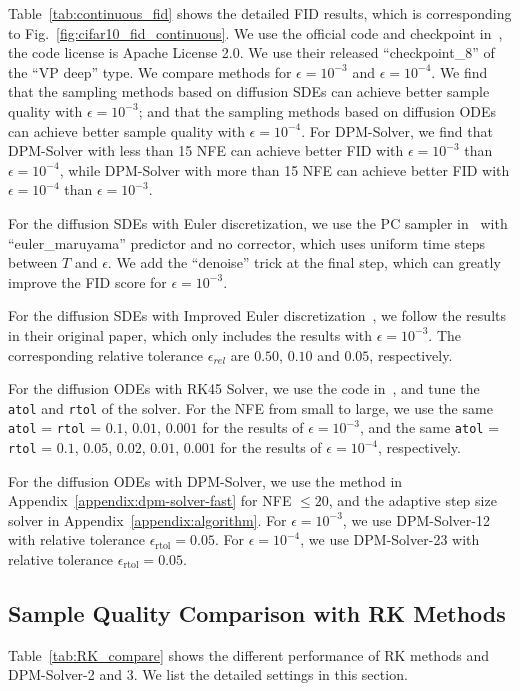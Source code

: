 Table~\ref{tab:continuous_fid} shows the detailed FID results, which is corresponding to Fig.~\ref{fig:cifar10_fid_continuous}. We use the official code and checkpoint in~\citep{song2020score}, the code license is Apache License 2.0. We use their released ``checkpoint\_8'' of the ``VP deep'' type. We compare methods for $\epsilon=10^{-3}$ and $\epsilon=10^{-4}$. We find that the sampling methods based on diffusion SDEs can achieve better sample quality with $\epsilon=10^{-3}$; and that the sampling methods based on diffusion ODEs can achieve better sample quality with $\epsilon=10^{-4}$. For DPM-Solver, we find that DPM-Solver with less than 15 NFE can achieve better FID with $\epsilon=10^{-3}$ than $\epsilon=10^{-4}$, while DPM-Solver with more than 15 NFE can achieve better FID with $\epsilon=10^{-4}$ than $\epsilon=10^{-3}$.

For the diffusion SDEs with Euler discretization, we use the PC sampler in~\citep{song2020score} with ``euler\_maruyama'' predictor and no corrector, which uses uniform time steps between $T$ and $\epsilon$. We add the ``denoise'' trick at the final step, which can greatly improve the FID score for $\epsilon=10^{-3}$.

For the diffusion SDEs with Improved Euler discretization~\citep{jolicoeur2021gotta}, we follow the results in their original paper, which only includes the results with $\epsilon=10^{-3}$. The corresponding relative tolerance $\epsilon_{rel}$ are $0.50$, $0.10$ and $0.05$, respectively.

For the diffusion ODEs with RK45 Solver, we use the code in~\citep{song2020score}, and tune the \texttt{atol} and \texttt{rtol} of the solver. For the NFE from small to large, we use the same \texttt{atol} = \texttt{rtol} = $0.1$, $0.01$, $0.001$ for the results of $\epsilon=10^{-3}$, and the same \texttt{atol} = \texttt{rtol} = $0.1$, $0.05$, $0.02$, $0.01$, $0.001$ for the results of $\epsilon=10^{-4}$, respectively.

For the diffusion ODEs with DPM-Solver, we use the method in Appendix~\ref{appendix:dpm-solver-fast} for NFE $\leq 20$, and the adaptive step size solver in Appendix~\ref{appendix:algorithm}. For $\epsilon=10^{-3}$, we use DPM-Solver-12 with relative tolerance $\epsilon_{\text{rtol}}=0.05$. For $\epsilon=10^{-4}$, we use DPM-Solver-23 with relative tolerance $\epsilon_{\text{rtol}}=0.05$. 

\subsection{Sample Quality Comparison with RK Methods}
Table~\ref{tab:RK_compare} shows the different performance of RK methods and DPM-Solver-2 and 3. We list the detailed settings in this section.

